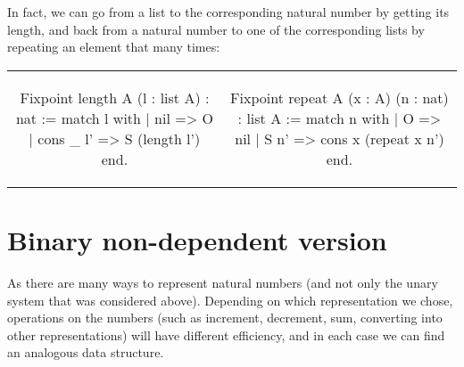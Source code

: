 \documentclass{article}
\newenvironment{no_padding_center}
    {\parskip=0pt\par\nopagebreak\centering}
    {\par\noindent}
\begin{document}
\begin{center}
\end{center}

In fact, we can go from a list to the corresponding natural number by getting its length, and back from a natural number to one of the corresponding lists by repeating an element that many times:

\begin{no_padding_center}
    \begin{tabular}{c c}
        \begin{coq}
Fixpoint length {A} (l : list A) : nat :=
  match l with
  | nil => O
  | cons _ l' => S (length l')
  end.
        \end{coq} &
        \begin{coq}
Fixpoint repeat {A} (x : A) (n : nat) : list A :=
  match n with
  | O => nil
  | S n' => cons x (repeat x n')
  end.
        \end{coq}
    \end{tabular}
\end{no_padding_center}

\section{Binary non-dependent version}

As there are many ways to represent natural numbers (and not only the unary system that was considered above). Depending on which representation we chose, operations on the numbers (such as increment, decrement, sum, converting into other representations) will have different efficiency, and in each case we can find an analogous data structure.
\end{document}
